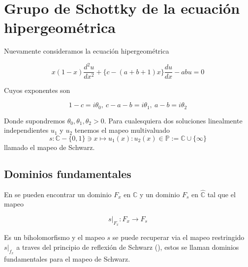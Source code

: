 



\chapter{Grupo de Schottky de la ecuaci\'on hipergeom\'etrica}
\label{cha:grupo schottky}





Nuevamente consideramos la ecuaci\'on hipergeom\'etrica

  $$x(1-x)\frac{d^{2}u}{dx^{2}} +  \lbrace c- (a+b+1 )x \rbrace \frac{du}{dx} - abu=0 $$

Cuyos exponentes son

$$ 1-c = i\theta_{0}, \ c-a-b = i \theta_{1},  \ a-b=i\theta_{2}  $$

Donde supondremos $\theta_{0}, \theta_{1} , \theta_{2} > 0$. Para cualesquiera dos soluciones linealmente independientes $u_{1}$ y $u_{2}$ tenemos el mapeo multivaluado $$s: \mathbb{C} -\lbrace0,1  \rbrace \ni x \mapsto u_{1}(x):u_{2}(x) \in \mathbb{P} := \mathbb{C} \cup \lbrace \infty \rbrace $$ llamado el mapeo de Schwarz.

\section{Dominios fundamentales}

 En \cite{geometricstudy} se pueden encontrar un  dominio $F_{x} $ en $\mathbb{C}$ y un dominio $F_{s}$ en $\widehat{\mathbb{C}}$ tal que el mapeo

 $$ s|_{F_{x}}: F_{x} \rightarrow F_{s}$$

  Es un biholomorfismo  y el mapeo $s$ se puede recuperar via el mapeo restringido $s|_{f_{x}}$ a traves del principio de reflexi\'on de Schwarz (\cite{geometricstudy}), estos se llaman dominios fundamentales para el mapeo de Schwarz. \\

